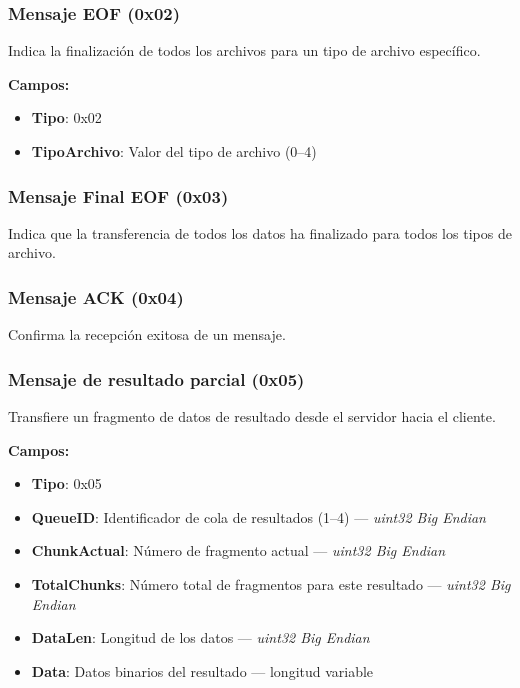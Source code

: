 \documentclass[titlepage,a4paper]{article}
\begin{document}
\subsubsection{Mensaje EOF (0x02)}

Indica la finalización de todos los archivos para un tipo de archivo específico.

\textbf{Campos:}
\begin{itemize}
	\item \textbf{Tipo}: 0x02
	\item \textbf{TipoArchivo}: Valor del tipo de archivo (0–4)
\end{itemize}

\subsubsection{Mensaje Final EOF (0x03)}

Indica que la transferencia de todos los datos ha finalizado para todos los tipos de archivo.

\subsubsection{Mensaje ACK (0x04)}

Confirma la recepción exitosa de un mensaje.

\subsubsection{Mensaje de resultado parcial (0x05)}

Transfiere un fragmento de datos de resultado desde el servidor hacia el cliente.

\textbf{Campos:}
\begin{itemize}
	\item \textbf{Tipo}: 0x05
	\item \textbf{QueueID}: Identificador de cola de resultados (1–4) — \textit{uint32 Big Endian}
	\item \textbf{ChunkActual}: Número de fragmento actual — \textit{uint32 Big Endian}
	\item \textbf{TotalChunks}: Número total de fragmentos para este resultado — \textit{uint32 Big Endian}
	\item \textbf{DataLen}: Longitud de los datos — \textit{uint32 Big Endian}
	\item \textbf{Data}: Datos binarios del resultado — longitud variable
\end{itemize}
\end{document}
